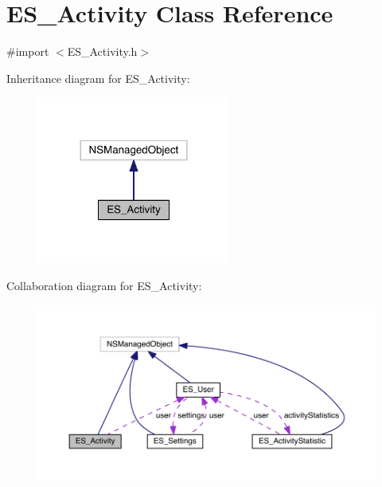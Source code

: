 \hypertarget{interface_e_s___activity}{\section{E\+S\+\_\+\+Activity Class Reference}
\label{interface_e_s___activity}
}


{\ttfamily \#import $<$E\+S\+\_\+\+Activity.\+h$>$}



Inheritance diagram for E\+S\+\_\+\+Activity\+:\nopagebreak
\begin{figure}[H]
\begin{center}
\leavevmode
\includegraphics[width=180pt]{d9/d9a/interface_e_s___activity__inherit__graph}
\end{center}
\end{figure}


Collaboration diagram for E\+S\+\_\+\+Activity\+:\nopagebreak
\begin{figure}[H]
\begin{center}
\leavevmode
\includegraphics[width=350pt]{d6/d6b/interface_e_s___activity__coll__graph}
\end{center}
\end{figure}

